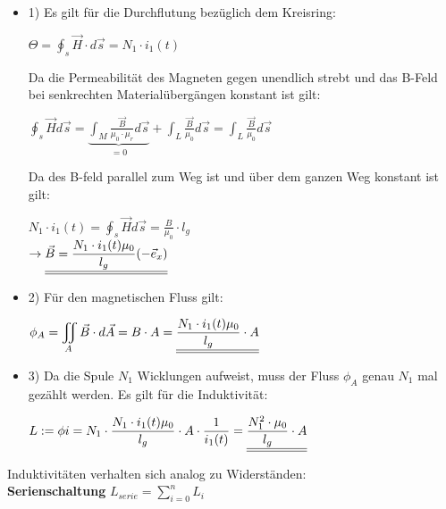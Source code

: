 \iend
\newpage


\beginbsp
\begin{itemize}
\item 1) Es gilt für die Durchflutung bezüglich dem Kreisring:
			\begin{center}
				$\Theta =  \oint_s \vec{H}\cdot d\vec{s} = N_1\cdot i_1(t)$
			\end{center}
			Da die Permeabilität des Magneten gegen unendlich strebt und das B-Feld bei senkrechten Materialübergängen konstant ist gilt: \\

			\begin{center}
			$\displaystyle \oint_s \vec{H} d\vec{s} = \underbrace{\int_{M} \frac{\vec{B}}{\mu_0 \cdot \mu_r} d\vec{s}}_{=0} + \int_{L} \frac{\vec{B}}{\mu_0} d\vec{s} = \int_{L} \frac{\vec{B}}{\mu_0} d\vec{s} $
		\end{center}
		Da des B-feld parallel zum Weg ist und über dem ganzen Weg konstant ist gilt:
		\begin{center}
				$\displaystyle N_1 \cdot i_1(t) = \displaystyle \oint_s \vec{H} d\vec{s} = \frac{B}{\mu_0} \cdot l_g$ \\
				$\displaystyle \rightarrow \underline{\underline{\vec{B} = \frac{N_1 \cdot i_1(t) \mu_0}{l_g} (-\vec{e}_x)}}$
		\end{center}

		\item 2) Für den magnetischen Fluss gilt:
		\begin{center}
				$\displaystyle \phi_A = \iint_A \vec{B} \cdot d\vec{A} = B \cdot A =\underline{\underline{\frac{N_1 \cdot i_1(t) \mu_0}{l_g} \cdot A}}$
		\end{center}

		\item 3) Da die Spule $N_1$ Wicklungen aufweist, muss der Fluss $\phi_A$ genau $N_1$ mal gezählt werden. Es gilt für die Induktivität:
		\begin{center}
				$ \displaystyle L:= {\phi}{i} = N_1 \cdot  \frac{N_1 \cdot i_1(t) \mu_0}{l_g} \cdot A \cdot \frac{1}{i_1(t)} =  \underline{\underline{\frac{N_1^2 \cdot \mu_0}{l_g} \cdot A}}$
		\end{center}
\end{itemize}

\iend




	 \beginip
	 	Induktivitäten verhalten sich analog zu Widerständen: \\
		\textbf{Serienschaltung}
		\formulaBegin
		$ L_{serie} = \sum_{i=0}^n L_i $
		\formulaEnd

